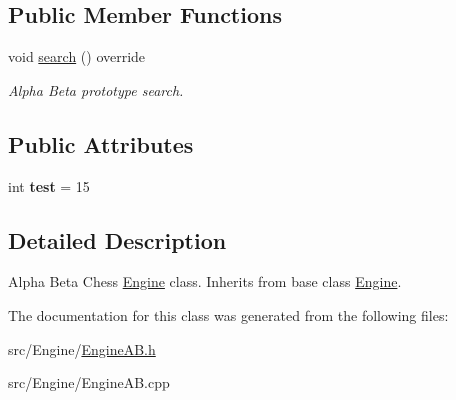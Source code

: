 \subsection*{Public Member Functions}
\begin{DoxyCompactItemize}
\item 
\mbox{\label{classEngineAlphaBeta_afea6d4b88e7fe762f31208645bdbd203}} 
void \hyperlink{classEngineAlphaBeta_afea6d4b88e7fe762f31208645bdbd203}{search} () override
\begin{DoxyCompactList}\small\item\em Alpha Beta prototype search. \end{DoxyCompactList}\end{DoxyCompactItemize}
\subsection*{Public Attributes}
\begin{DoxyCompactItemize}
\item 
\mbox{\label{classEngineAlphaBeta_a40e006a5eb4f51f468914de7b1f33747}} 
int {\bfseries test} = 15
\end{DoxyCompactItemize}


\subsection{Detailed Description}
Alpha Beta Chess \hyperlink{classEngine}{Engine} class. Inherits from base class \hyperlink{classEngine}{Engine}. 

The documentation for this class was generated from the following files\+:\begin{DoxyCompactItemize}
\item 
src/\+Engine/\hyperlink{EngineAB_8h}{Engine\+A\+B.\+h}\item 
src/\+Engine/Engine\+A\+B.\+cpp\end{DoxyCompactItemize}
